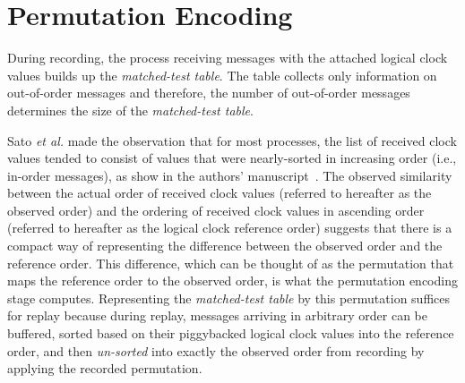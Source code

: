 \section{Permutation Encoding} 
\label{sec:permutation_encoding}

During recording, the process receiving messages with the attached
logical clock values builds up the \textit{matched-test table}. The
table collects only information on out-of-order messages and
therefore, the number of out-of-order messages determines the size of
the \textit{matched-test table}.

Sato \textit{et al.}  made the observation that for most processes,
the list of received clock values tended to consist of values that
were nearly-sorted in increasing order (i.e., in-order messages), as
show in the authors'
manuscript~\cite{ClockDeltaCompression:Sato:2015}.  The observed
similarity between the actual order of received clock values (referred
to hereafter as the observed order) and the ordering of received clock
values in ascending order (referred to hereafter as the logical clock
reference order) suggests that there is a compact way of representing
the difference between the observed order and the reference
order. This difference, which can be thought of as the permutation
that maps the reference order to the observed order, is what the
permutation encoding stage computes.  Representing the
\textit{matched-test table} by this permutation suffices for replay
because during replay, messages arriving in arbitrary order can be
buffered, sorted based on their piggybacked logical clock values into
the reference order, and then \textit{un-sorted} into exactly the
observed order from recording by applying the recorded permutation.

